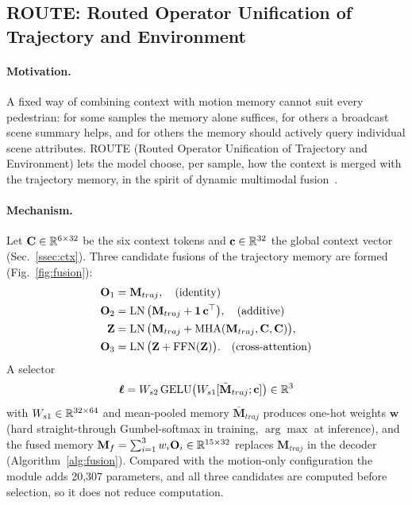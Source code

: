 \subsection{ROUTE: Routed Operator Unification of Trajectory and Environment}\label{ssec:fusion}
\paragraph{Motivation.} A fixed way of combining context with motion memory cannot suit every pedestrian: for some samples the memory alone suffices, for others a broadcast scene summary helps, and for others the memory should actively query individual scene attributes. ROUTE (Routed Operator Unification of Trajectory and Environment) lets the model choose, per sample, how the context is merged with the trajectory memory, in the spirit of dynamic multimodal fusion~\citep{xue2022dynmm}.

\paragraph{Mechanism.} Let $\mathbf{C}\in\mathbb{R}^{6\times32}$ be the six context tokens and $\mathbf{c}\in\mathbb{R}^{32}$ the global context vector (Sec.~\ref{ssec:ctx}). Three candidate fusions of the trajectory memory are formed (Fig.~\ref{fig:fusion}):
\begin{align}
\mathbf{O}_1&=\mathbf{M}_{traj}, \quad\text{(identity)}\\
\mathbf{O}_2&=\operatorname{LN}\big(\mathbf{M}_{traj}+\mathbf{1}\,\mathbf{c}^\top\big), \quad\text{(additive)}\\
\mathbf{Z}&=\operatorname{LN}\big(\mathbf{M}_{traj}+\operatorname{MHA}(\mathbf{M}_{traj},\mathbf{C},\mathbf{C})\big),\\
\mathbf{O}_3&=\operatorname{LN}\big(\mathbf{Z}+\operatorname{FFN}(\mathbf{Z})\big). \quad\text{(cross-attention)}
\end{align}
A selector
\begin{equation}\boldsymbol{\ell}=W_{s2}\,\mathrm{GELU}\big(W_{s1}[\bar{\mathbf{M}}_{traj};\mathbf{c}]\big)\in\mathbb{R}^{3}\end{equation}
with $W_{s1}\in\mathbb{R}^{32\times64}$ and mean-pooled memory $\bar{\mathbf{M}}_{traj}$ produces one-hot weights $\mathbf{w}$ (hard straight-through Gumbel-softmax in training, $\arg\max$ at inference), and the fused memory $\mathbf{M}_f=\sum_{i=1}^{3}w_i\mathbf{O}_i\in\mathbb{R}^{15\times32}$ replaces $\mathbf{M}_{traj}$ in the decoder (Algorithm~\ref{alg:fusion}). Compared with the motion-only configuration the module adds 20,307 parameters, and all three candidates are computed before selection, so it does not reduce computation.


